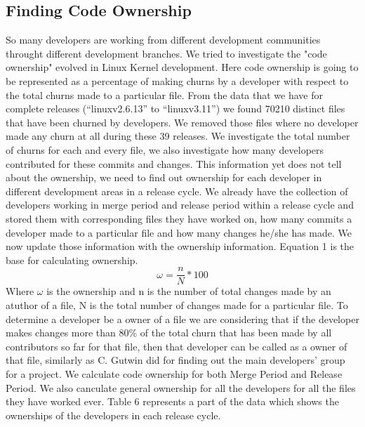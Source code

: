 \documentclass{acm_proc_article-sp}
\begin{document}
\subsection{Finding Code Ownership}
So many developers are working from different development communities throught different development branches. We tried to investigate the "code ownership" \cite{mockus_case_study} evolved in Linux Kernel development. Here code ownership is going to be represented as a percentage of making churns by a developer with respect to the total churns made to a particular file. From the data that we have for complete releases (``linuxv2.6.13'' to ``linuxv3.11'') we found 70210 distinct files that have been churned by developers. We removed those files where no developer made any churn at all during these 39 releases. We investigate the total number of churns for each and every file, we also investigate how many developers contributed for these commits and changes. This information yet does not tell about the ownership, we need to find out ownership for each developer in different development areas in a release cycle. We already have the collection of developers working in merge period and release period within a release cycle and stored them with corresponding files they have worked on, how many commits a developer made to a particular file and how many changes he/she has made. We now update those information with the ownership information. Equation 1 is the base for calculating ownership.
\begin{equation}\omega=\frac{n}{N}*100\end{equation}
Where $\omega$ is the ownership and n is the number of total changes made by an atuthor of a file, N is the total number of changes made for a particular file.
To determine a developer be a owner of a file we are considering that if the developer makes changes more than 80\% of the total churn that has been made by all contributors so far for that file, then that developer can be called as a owner of that file, similarly as C. Gutwin did \cite{gutwin_awareness} for finding out the main developers' group for a project. We calculate code ownership for both Merge Period and Release Period. We also canculate general ownership for all the developers for all the files they have worked ever. Table 6 represents a part of the data which shows the ownerships of the developers in each release cycle.
\end{document}
